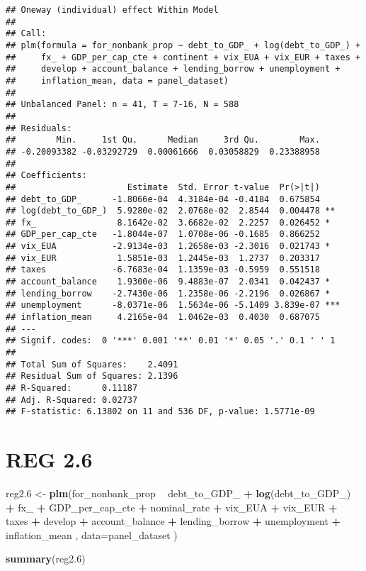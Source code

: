 \documentclass[]{article}
\newenvironment{Shaded}{\begin{snugshade}}{\end{snugshade}}
\newcommand{\KeywordTok}[1]{\textcolor[rgb]{0.13,0.29,0.53}{\textbf{#1}}}
\newcommand{\DataTypeTok}[1]{\textcolor[rgb]{0.13,0.29,0.53}{#1}}
\newcommand{\DecValTok}[1]{\textcolor[rgb]{0.00,0.00,0.81}{#1}}
\newcommand{\StringTok}[1]{\textcolor[rgb]{0.31,0.60,0.02}{#1}}
\newcommand{\OperatorTok}[1]{\textcolor[rgb]{0.81,0.36,0.00}{\textbf{#1}}}
\newcommand{\NormalTok}[1]{#1}
\begin{document}
\begin{verbatim}
## Oneway (individual) effect Within Model
## 
## Call:
## plm(formula = for_nonbank_prop ~ debt_to_GDP_ + log(debt_to_GDP_) + 
##     fx_ + GDP_per_cap_cte + continent + vix_EUA + vix_EUR + taxes + 
##     develop + account_balance + lending_borrow + unemployment + 
##     inflation_mean, data = panel_dataset)
## 
## Unbalanced Panel: n = 41, T = 7-16, N = 588
## 
## Residuals:
##        Min.     1st Qu.      Median     3rd Qu.        Max. 
## -0.20093382 -0.03292729  0.00061666  0.03058829  0.23388958 
## 
## Coefficients:
##                      Estimate  Std. Error t-value  Pr(>|t|)    
## debt_to_GDP_      -1.8066e-04  4.3184e-04 -0.4184  0.675854    
## log(debt_to_GDP_)  5.9280e-02  2.0768e-02  2.8544  0.004478 ** 
## fx_                8.1642e-02  3.6682e-02  2.2257  0.026452 *  
## GDP_per_cap_cte   -1.8044e-07  1.0708e-06 -0.1685  0.866252    
## vix_EUA           -2.9134e-03  1.2658e-03 -2.3016  0.021743 *  
## vix_EUR            1.5851e-03  1.2445e-03  1.2737  0.203317    
## taxes             -6.7683e-04  1.1359e-03 -0.5959  0.551518    
## account_balance    1.9300e-06  9.4883e-07  2.0341  0.042437 *  
## lending_borrow    -2.7430e-06  1.2358e-06 -2.2196  0.026867 *  
## unemployment      -8.0371e-06  1.5634e-06 -5.1409 3.839e-07 ***
## inflation_mean     4.2165e-04  1.0462e-03  0.4030  0.687075    
## ---
## Signif. codes:  0 '***' 0.001 '**' 0.01 '*' 0.05 '.' 0.1 ' ' 1
## 
## Total Sum of Squares:    2.4091
## Residual Sum of Squares: 2.1396
## R-Squared:      0.11187
## Adj. R-Squared: 0.02737
## F-statistic: 6.13802 on 11 and 536 DF, p-value: 1.5771e-09
\end{verbatim}

\section{REG 2.6}\label{reg-2.6}

\begin{Shaded}
\begin{Highlighting}[]
\NormalTok{reg2.}\DecValTok{6}\NormalTok{ <-}\StringTok{ }\KeywordTok{plm}\NormalTok{(for_nonbank_prop }\OperatorTok{~}\StringTok{  }\NormalTok{debt_to_GDP_ }\OperatorTok{+}\StringTok{ }\KeywordTok{log}\NormalTok{(debt_to_GDP_) }\OperatorTok{+}\StringTok{ }\NormalTok{fx_ }\OperatorTok{+}\StringTok{ }\NormalTok{GDP_per_cap_cte }\OperatorTok{+}\StringTok{  }\NormalTok{nominal_rate }\OperatorTok{+}\StringTok{  }\NormalTok{vix_EUA }\OperatorTok{+}\StringTok{ }\NormalTok{vix_EUR }\OperatorTok{+}\StringTok{ }\NormalTok{taxes }\OperatorTok{+}\StringTok{ }\NormalTok{develop }\OperatorTok{+}\StringTok{ }\NormalTok{account_balance }\OperatorTok{+}\StringTok{ }\NormalTok{lending_borrow }\OperatorTok{+}\StringTok{ }\NormalTok{unemployment }\OperatorTok{+}\StringTok{ }\NormalTok{inflation_mean , }\DataTypeTok{data=}\NormalTok{panel_dataset  )}

\KeywordTok{summary}\NormalTok{(reg2.}\DecValTok{6}\NormalTok{)}
\end{Highlighting}
\end{Shaded}
\end{document}
